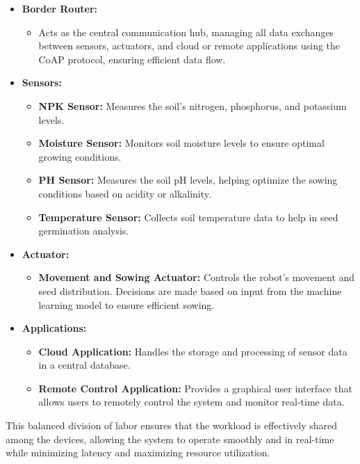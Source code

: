 \begin{itemize} 
    \item \textbf{Border Router:} 
    \begin{itemize} 
        \item Acts as the central communication hub, managing all data exchanges between sensors, actuators, and cloud or remote applications using the CoAP protocol, ensuring efficient data flow. 
    \end{itemize} 
    \item \textbf{Sensors:} 
    \begin{itemize} 
        \item \textbf{NPK Sensor:} Measures the soil's nitrogen, phosphorus, and potassium levels. 
        \item \textbf{Moisture Sensor:} Monitors soil moisture levels to ensure optimal growing conditions. 
        \item \textbf{PH Sensor:} Measures the soil pH levels, helping optimize the sowing conditions based on acidity or alkalinity. 
        \item \textbf{Temperature Sensor:} Collects soil temperature data to help in seed germination analysis. 
    \end{itemize} \item \textbf{Actuator:} 
    \begin{itemize} \item \textbf{Movement and Sowing Actuator:} Controls the robot’s movement and seed distribution. Decisions are made based on input from the machine learning model to ensure efficient sowing. 
    \end{itemize} \item \textbf{Applications:} 
    \begin{itemize} \item \textbf{Cloud Application:} Handles the storage and processing of sensor data in a central database. 
        \item \textbf{Remote Control Application:} Provides a graphical user interface that allows users to remotely control the system and monitor real-time data. 
    \end{itemize} 
\end{itemize}

This balanced division of labor ensures that the workload is effectively shared among the devices, allowing the system to operate smoothly and in real-time while minimizing latency and maximizing resource utilization.